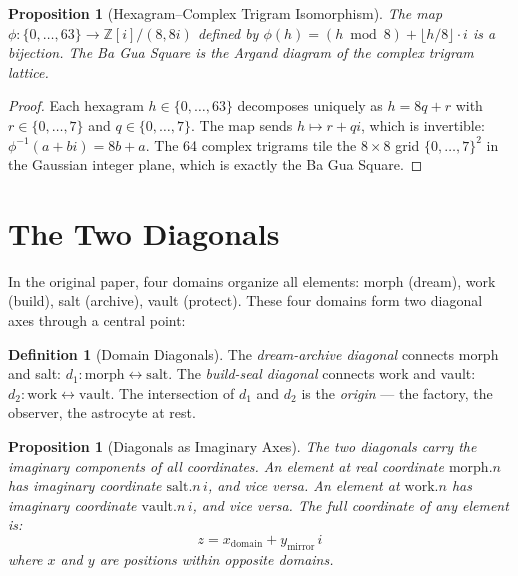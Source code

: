 \documentclass[12pt,a4paper]{article}
\newtheorem{proposition}[theorem]{Proposition}
\theoremstyle{definition}
\newtheorem{definition}[theorem]{Definition}
\theoremstyle{remark}
\newcommand{\ZZ}{\mathbb{Z}}
\begin{document}
\begin{proposition}[Hexagram--Complex Trigram Isomorphism]
The map $\phi: \{0,\ldots,63\} \to \ZZ[i] / (8,8i)$ defined by
$\phi(h) = (h \bmod 8) + \lfloor h/8 \rfloor \cdot i$ is a bijection.
The Ba Gua Square is the Argand diagram of the complex trigram lattice.
\end{proposition}

\begin{proof}
Each hexagram $h \in \{0,\ldots,63\}$ decomposes uniquely as $h = 8q + r$
with $r \in \{0,\ldots,7\}$ and $q \in \{0,\ldots,7\}$. The map sends
$h \mapsto r + qi$, which is invertible: $\phi^{-1}(a+bi) = 8b + a$.
The 64 complex trigrams tile the $8 \times 8$ grid $\{0,\ldots,7\}^2$
in the Gaussian integer plane, which is exactly the Ba Gua Square.
\end{proof}

\section{The Two Diagonals}\label{sec:diagonals}

In the original paper, four domains organize all elements: morph (dream),
work (build), salt (archive), vault (protect). These four domains form two
diagonal axes through a central point:

\begin{definition}[Domain Diagonals]
The \emph{dream-archive diagonal} connects morph and salt:
$d_1: \mathrm{morph} \leftrightarrow \mathrm{salt}$.
The \emph{build-seal diagonal} connects work and vault:
$d_2: \mathrm{work} \leftrightarrow \mathrm{vault}$.
The intersection of $d_1$ and $d_2$ is the \emph{origin} --- the factory,
the observer, the astrocyte at rest.
\end{definition}

\begin{proposition}[Diagonals as Imaginary Axes]
The two diagonals carry the imaginary components of all coordinates.
An element at real coordinate $\mathrm{morph}.n$ has imaginary coordinate
$\mathrm{salt}.n\,i$, and vice versa. An element at $\mathrm{work}.n$
has imaginary coordinate $\mathrm{vault}.n\,i$, and vice versa.
The full coordinate of any element is:
\begin{equation}\label{eq:complex-coord}
  z = x_{\mathrm{domain}} + y_{\mathrm{mirror}}\,i
\end{equation}
where $x$ and $y$ are positions within opposite domains.
\end{proposition}
\end{document}
